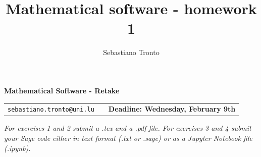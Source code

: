 \documentclass[12pt,a4paper]{article}
\title{Mathematical software - homework 1}
\author{Sebastiano Tronto}
\theoremstyle{definition}
\theoremstyle{definition}
\begin{document}
\noindent\hrulefill

\begin{center}
\Huge{\textbf{Mathematical Software - Retake}}
\end{center}

\noindent\hrulefill
\begin{center}
\begin{tabular}{lcr}
\texttt{sebastiano.tronto@uni.lu} & \qquad \qquad \qquad \qquad &
\textbf{Deadline: Wednesday, February 9th}
\end{tabular}
\end{center}

\vspace{0.3cm}

\begin{center}
  \emph{\large For exercises 1 and 2 submit a .tex and a .pdf file.
    For exercises 3 and 4 submit your Sage code either in text format (.txt or
    .sage) or as a Jupyter Notebook file (.ipynb).
  }
\end{center}
\end{document}
